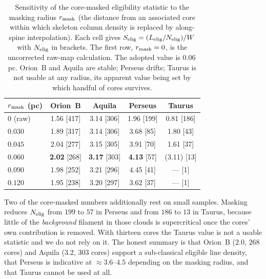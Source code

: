 \documentclass[usenatbib,twoside,twocolumn]{mnras}
\begin{document}
\begin{table}
\caption{Sensitivity of the core-masked eligibility statistic to the masking radius $r_{\rm mask}$ (the distance from an associated core within which skeleton column density is replaced by along-spine interpolation). Each cell gives $S_{\rm elig}=(L_{\rm elig}/N_{\rm elig})/W$ with $N_{\rm elig}$ in brackets. The first row, $r_{\rm mask}=0$, is the uncorrected raw-map calculation. The adopted value is $0.06$\,pc. Orion~B and Aquila are stable; Perseus drifts; Taurus is not usable at any radius, its apparent value being set by which handful of cores survives.}
\label{tab:maskrad}
\footnotesize
\setlength{\tabcolsep}{4pt}
\begin{tabular}{lcccc}
\toprule
$r_{\rm mask}$ (pc) & Orion~B & Aquila & Perseus & Taurus \\
\midrule
$0$ (raw)      & 1.56 [417] & 3.14 [306] & 1.96 [199] & 0.81 [186] \\
$0.030$        & 1.89 [317] & 3.14 [306] & 3.68 [85]  & 1.80 [43] \\
$0.045$        & 2.04 [277] & 3.15 [305] & 3.91 [70]  & 1.61 [37] \\
$0.060$        & \textbf{2.02} [268] & \textbf{3.17} [303] & \textbf{4.13} [57] & (3.11) [13] \\
$0.090$        & 1.98 [252] & 3.21 [296] & 4.45 [41]  & --- [1] \\
$0.120$        & 1.95 [238] & 3.20 [297] & 3.62 [37]  & --- [1] \\
\bottomrule
\end{tabular}
\end{table}

Two of the core-masked numbers additionally rest on small samples. Masking reduces $N_{\rm elig}$ from $199$ to $57$ in Perseus and from $186$ to $13$ in Taurus, because little of the \emph{background} filament in those clouds is supercritical once the cores' own contribution is removed. With thirteen cores the Taurus value is not a usable statistic and we do not rely on it. The honest summary is that Orion~B ($2.0$, $268$ cores) and Aquila ($3.2$, $303$ cores) support a sub-classical eligible line density, that Perseus is indicative at $\approx3.6$--$4.5$ depending on the masking radius, and that Taurus cannot be used at all.
\end{document}
